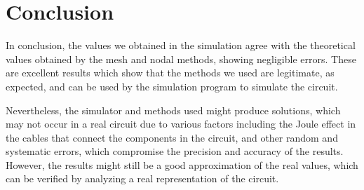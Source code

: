 \section{Conclusion}
\label{sec:conclusion}

	In conclusion, the values we obtained in the simulation agree with the theoretical values obtained by the mesh and nodal methods, showing negligible errors. These are excellent results which show that the methods we used are legitimate, as expected, and can be used by the simulation program to simulate the circuit.
	
Nevertheless, the simulator and methods used might produce solutions, which may not occur in a real circuit due to various factors including the Joule effect in the cables that connect the components in the circuit, and other random and systematic errors, which compromise the precision and accuracy of the results. However, the results might still be a good approximation of the real values, which can be verified by analyzing a real representation of the circuit.

